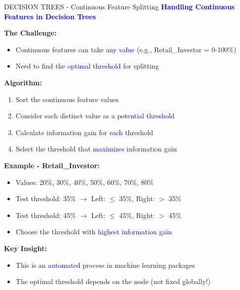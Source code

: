 \documentclass[8pt]{beamer}
\begin{document}
	\begin{frame}{DECISION TREES - Continuous Feature Splitting}
		\fontsize{6.5}{7.5}\selectfont
		\textcolor{blue}{\textbf{Handling Continuous Features in Decision Trees}}
		
		\textbf{The Challenge:}
		\begin{itemize}
			\item Continuous features can take \textcolor{blue}{any value} (e.g., Retail\_Investor = 0-100\%)
			\item Need to find the \textcolor{blue}{optimal threshold} for splitting
		\end{itemize}
		
		\textbf{Algorithm:}
		\begin{enumerate}
			\item Sort the continuous feature values
			\item Consider each distinct value as a \textcolor{blue}{potential threshold}
			\item Calculate information gain for \textcolor{blue}{each} threshold
			\item Select the threshold that \textcolor{blue}{maximizes} information gain
		\end{enumerate}
		
		\textbf{Example - Retail\_Investor:}
		\begin{itemize}
			\item Values: 20\%, 30\%, 40\%, 50\%, 60\%, 70\%, 80\%
			\item Test threshold: 35\% $\rightarrow$ Left: $\leq$ 35\%, Right: $>$ 35\%
			\item Test threshold: 45\% $\rightarrow$ Left: $\leq$ 45\%, Right: $>$ 45\%
			\item Choose the threshold with \textcolor{blue}{highest information gain}
		\end{itemize}
		
		\textbf{Key Insight:}
		\begin{itemize}
			\item This is an \textcolor{blue}{automated} process in machine learning packages
			\item The optimal threshold depends on the \textcolor{blue}{node} (not fixed globally!)
		\end{itemize}
	\end{frame}
	
\end{document}
